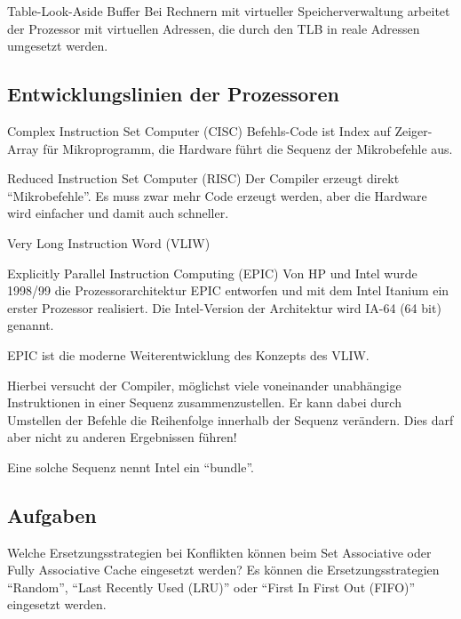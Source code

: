 \begin{defi}{Table-Look-Aside Buffer}
  Bei Rechnern mit virtueller Speicherverwaltung arbeitet der Prozessor mit virtuellen Adressen,
  die durch den TLB in reale Adressen umgesetzt werden.
\end{defi}

\subsection{Entwicklungslinien der Prozessoren}\label{subsec:entwicklungslinien-der-prozessoren}

\begin{defi}{Complex Instruction Set Computer (CISC)}
  Befehls-Code ist Index auf Zeiger-Array für Mikroprogramm,
  die Hardware führt die Sequenz der Mikrobefehle aus.
\end{defi}

\begin{defi}{Reduced Instruction Set Computer (RISC)}
  Der Compiler erzeugt direkt \enquote{Mikrobefehle}.
  Es muss zwar mehr Code erzeugt werden,
  aber die Hardware wird einfacher und damit auch schneller.
\end{defi}

\begin{defi}{Very Long Instruction Word (VLIW)}
\end{defi}

\begin{defi}{Explicitly Parallel Instruction Computing (EPIC)}
  Von HP und Intel wurde 1998/99 die Prozessorarchitektur EPIC entworfen
  und mit dem Intel Itanium ein erster Prozessor realisiert.
  Die Intel-Version der Architektur wird IA-64 (64 bit) genannt.

  EPIC ist die moderne Weiterentwicklung des Konzepts des VLIW.

  Hierbei versucht der Compiler,
  möglichst viele voneinander unabhängige Instruktionen in einer Sequenz zusammenzustellen.
  Er kann dabei durch Umstellen der Befehle die Reihenfolge innerhalb der Sequenz verändern.
  Dies darf aber nicht zu anderen Ergebnissen führen!

  Eine solche Sequenz nennt Intel ein \enquote{bundle}.
\end{defi}

\subsection{Aufgaben}

{
  Welche Ersetzungsstrategien bei Konflikten können beim Set Associative oder Fully Associative Cache eingesetzt werden?
}
{
  Es können die Ersetzungsstrategien \enquote{Random},
  \enquote{Last Recently Used (LRU)} oder \enquote{First In First Out (FIFO)} eingesetzt werden.
}

